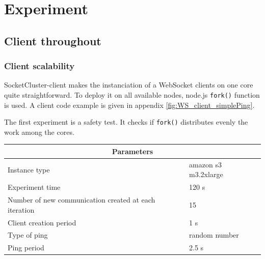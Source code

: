\chapter{Experiment} 
\label{Chapter3} 

\section{Client throughout}

\subsection{Client scalability}

SocketCluster-client makes the instanciation of a WebSocket clients on one core
quite straightforward. To deploy it on all available nodes, node.js
\texttt{fork()} function is used. A client code example is given in appendix
\ref{fig:WS_client_simplePing}.

The first experiment is a safety test. It checks if \texttt{fork()} distributes
evenly the work among the cores.

\begin{center}
  \begin{tabular}{ | l | l |}
  \hline
  \multicolumn{2}{|c|}{Parameters} \\
  \hline
    Instance type &  amazon s3 m3.2xlarge\\ 
    Experiment time & 120 s \\
    Number of new communication created at each iteration & 15 \\
    Client creation period & 1 s \\
    Type of ping & random number \\ 
    Ping period & 2.5 s \\ 
  \hline
  \end{tabular}
\end{center}

